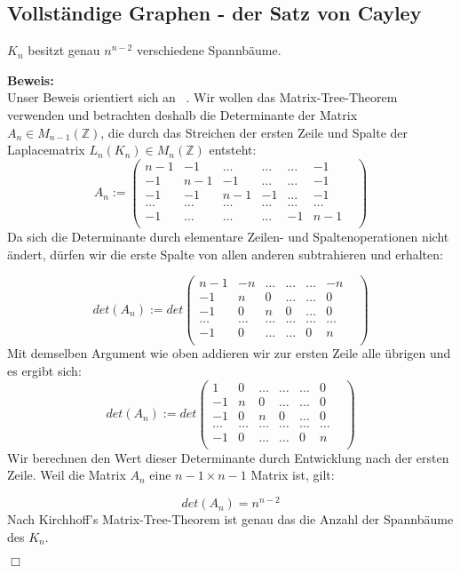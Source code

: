 \subsection{Vollständige Graphen - der Satz von Cayley}
\begin{Tms}
$K_n$ besitzt genau $n^{n-2}$ verschiedene Spannbäume.\\
\end{Tms}
\textbf{Beweis:}\\
Unser Beweis orientiert sich an ~\cite{Lau_2004}.
Wir wollen das Matrix-Tree-Theorem verwenden und betrachten deshalb die Determinante der Matrix $A_n\in M_{n-1}(\mathbb{Z})$, die durch das Streichen der ersten Zeile und Spalte der Laplacematrix $L_n(K_n)\in M_n(\mathbb{Z})$ entsteht:
\begin{equation}
A_n:=
\begin{pmatrix}
n-1&-1&\ldots&\ldots&\ldots&-1\\
-1&n-1&-1&\ldots&\ldots&-1\\
-1&-1&n-1&-1&\ldots&-1\\
\ldots&\ldots&\ldots&\ldots&\ldots&\ldots&\\
-1&\ldots&\ldots&\ldots&-1&n-1\\
\end{pmatrix}
\end{equation}
Da sich die Determinante durch elementare Zeilen- und Spaltenoperationen nicht ändert, dürfen wir die erste Spalte von allen anderen subtrahieren und erhalten:

\begin{equation}
det(A_n):=det
\begin{pmatrix}
n-1&-n&\ldots&\ldots&\ldots&-n\\
-1&n&0&\ldots&\ldots&0\\
-1&0&n&0&\ldots&0\\
\ldots&\ldots&\ldots&\ldots&\ldots&\ldots&\\
-1&0&\ldots&\ldots&0&n\\
\end{pmatrix}
\end{equation}
Mit demselben Argument wie oben addieren wir zur ersten Zeile alle übrigen und es ergibt sich:
\begin{equation}
det(A_n):=det
\begin{pmatrix}
1&0&\ldots&\ldots&\ldots&0\\
-1&n&0&\ldots&\ldots&0\\
-1&0&n&0&\ldots&0\\
\ldots&\ldots&\ldots&\ldots&\ldots&\ldots&\\
-1&0&\ldots&\ldots&0&n\\
\end{pmatrix}
\end{equation}
Wir berechnen den Wert dieser Determinante durch Entwicklung nach der ersten Zeile. Weil die Matrix $A_n$ eine $n-1 \times n-1$ Matrix ist, gilt:

\begin{equation}
 det(A_n)=n^{n-2}
\end{equation}
Nach Kirchhoff's Matrix-Tree-Theorem ist genau das die Anzahl der Spannbäume des $K_n$.
\begin{flushright} $\Box$ \end{flushright} 
